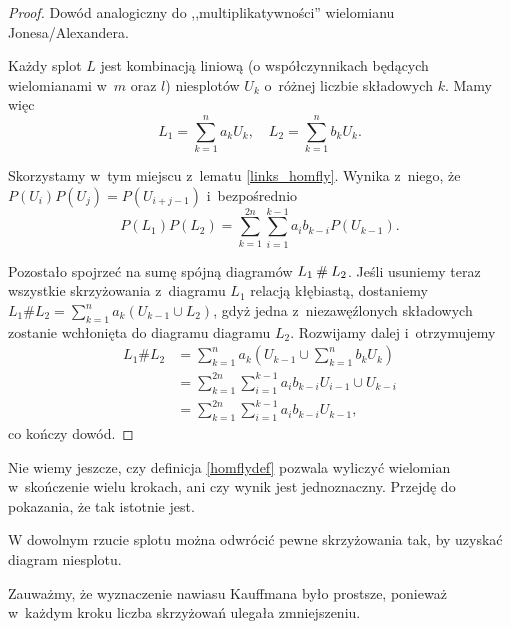 \begin{proof}
    Dowód analogiczny do ,,multiplikatywności'' wielomianu Jonesa/Alexandera.

    Każdy splot $L$ jest kombinacją liniową (o współczynnikach będących wielomianami w~$m$ oraz $l$) niesplotów $U_k$ o~różnej liczbie składowych $k$.
    Mamy więc
    \begin{equation}
        L_1 = \sum_{k=1}^n a_k U_k, \quad
        L_2 = \sum_{k=1}^n b_k U_k.
    \end{equation}

    Skorzystamy w~tym miejscu z~lematu \ref{links_homfly}.
    Wynika z~niego, że $P(U_i)P(U_j) = P(U_{i+j-1})$ i~bezpośrednio
    \begin{equation}
        P(L_1)P(L_2) = \sum_{k=1}^{2n} \sum_{i=1}^{k-1} a_i b_{k-i}P(U_{k-1}).
    \end{equation}

    Pozostało spojrzeć na sumę spójną diagramów  $L_1 \mathbin{\#} L_2$.
    Jeśli usuniemy teraz wszystkie skrzyżowania z~diagramu $L_1$ relacją kłębiastą, dostaniemy $L_1 \# L_2 = \sum_{k=1}^n a_k (U_{k-1} \cup L_2)$, gdyż jedna z~niezawęźlonych składowych zostanie wchłonięta do diagramu diagramu $L_2$.
    Rozwijamy dalej i~otrzymujemy
    \begin{align*}
        L_1 \# L_2 & = \sum_{k=1}^n a_k \left(U_{k-1} \cup \sum_{k=1}^n b_k U_k\right) \\
                   & = \sum_{k=1}^{2n} \sum_{i=1}^{k-1} a_i b_{k-i} U_{i-1} \cup U_{k-i} \\
                   & = \sum_{k=1}^{2n} \sum_{i=1}^{k-1} a_i b_{k-i} U_{k-1},
    \end{align*}
    co kończy dowód.
\end{proof}

Nie wiemy jeszcze, czy definicja \ref{homflydef} pozwala wyliczyć wielomian w~skończenie wielu krokach, ani czy wynik jest jednoznaczny.
Przejdę do pokazania, że tak istotnie jest.

\begin{lemma}
    W dowolnym rzucie splotu można odwrócić pewne skrzyżowania tak, by uzyskać diagram niesplotu.
\end{lemma}

Zauważmy, że wyznaczenie nawiasu Kauffmana było prostsze, ponieważ w~każdym kroku liczba skrzyżowań ulegała zmniejszeniu.

